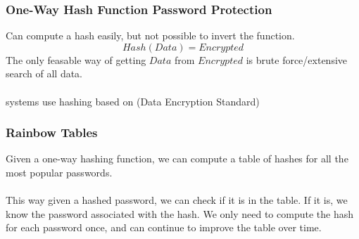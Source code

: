 \documentclass{report}
\begin{document}
            \subsubsection*{One-Way Hash Function Password Protection}
                Can compute a hash easily, but not possible to invert the function.
                \[Hash(Data) = Encrypted\]
                The only feasable way of getting $Data$ from $Encrypted$ is brute force/extensive search of all data.
                \\
                \\  systems use hashing based on  (Data Encryption Standard)
            \subsubsection*{Rainbow Tables}{
                Given a one-way hashing function, we can compute a table of hashes for all the most popular passwords.
                \\
                \\ This way given a hashed password, we can check if it is in the table. If it is, we know the password associated with the hash. We only need to compute the hash for each password once, and can continue to improve the table over time.
            
}
\end{document}
